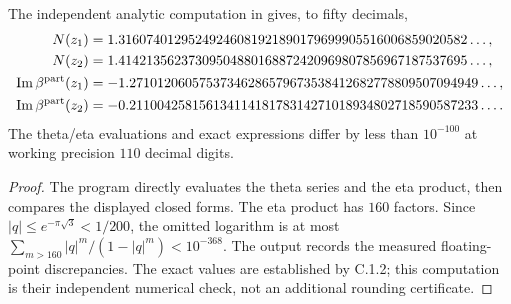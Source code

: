 \begin{proposition}\label{ari:C.1.3}
The independent analytic computation in
 gives, to fifty decimals,
\begin{align*}
 N(z_1)&=1.31607401295249246081921890179699905516006859020582\ldots,\\
 N(z_2)&=1.41421356237309504880168872420969807856967187537695\ldots,\\
 \operatorname{Im}\beta^{\rm part}(z_1)
  &=-1.27101206057537346286579673538412682778809507094949\ldots,\\
 \operatorname{Im}\beta^{\rm part}(z_2)
  &=-0.21100425815613411418178314271018934802718590587233\ldots.
\end{align*}
The theta/eta evaluations and exact expressions differ by less than
$10^{-100}$ at working precision $110$ decimal digits.
\end{proposition}
\begin{proof}
The program directly evaluates the theta series and the eta product,
then compares the displayed closed forms. The eta product has $160$
factors. Since $|q|\le e^{-\pi\sqrt3}<1/200$, the omitted logarithm is
at most $\sum_{m>160}|q|^m/(1-|q|^m)<10^{-368}$.
The output records the measured floating-point discrepancies. The
exact values are established by C.1.2; this computation is their
independent numerical check, not an additional rounding certificate.
\end{proof}

